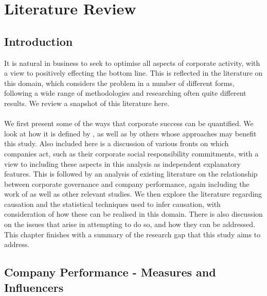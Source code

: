 %
%
%
\chapter{Literature Review}\label{C.LitReview}
\section{Introduction}\label{S.intro3}
{It is natural in business to seek to optimise all aspects of corporate activity, with a view to positively effecting the bottom line. This is reflected in the literature on this domain, which considers the problem in a number of different forms, following a wide range of methodologies and researching often quite different results. We review a snapshot of this literature here. \\\\
We first present some of the ways that corporate success can be quantified. We look at how it is defined by \cite{moldovan2015learning}, as well as by others whose approaches may benefit this study. Also included here is a discussion of various fronts on which companies act, such as their corporate social responsibility commitments, with a view to including these aspects in this analysis as independent explanatory features. This is followed by an analysis of existing literature on the relationship between corporate governance and company performance, again including the work of \cite{moldovan2015learning} as well as other relevant studies. We then explore the literature regarding causation and the statistical techniques used to infer causation, with consideration of how these can be realised in this domain. There is also discussion on the issues that arise in attempting to do so, and how they can be addressed. This chapter finishes with a summary of the research gap that this study aims to address. }
\section{Company Performance - Measures and Influencers}\label{comPerform}
